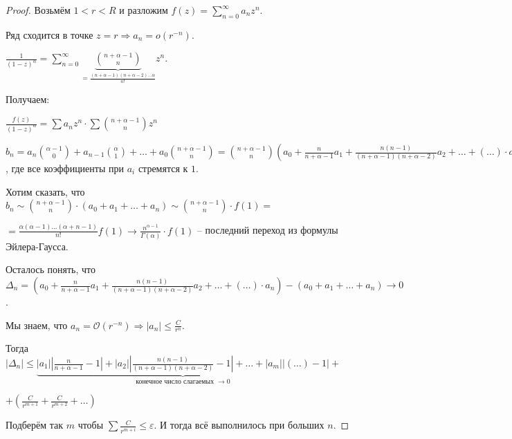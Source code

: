 \begin{proof}

    Возьмём $1 < r < R$ и разложим $f(z) = \sum_{n = 0}^{\infty} a_n z^n$.

    Ряд сходится в точке $z = r \Rightarrow a_n = o(r^{-n})$.

    $\frac{1}{(1 - z)^\alpha} = \sum_{n = 0}^{\infty} \underbrace{\binom{n + \alpha - 1}{n}}_{=\frac{(n + \alpha - 1)(n + \alpha - 2) \ldots \alpha}{n!}} z^n$.

    Получаем:

    $\frac{f(z)}{(1 - z)^\alpha} = \sum a_n z^n \cdot \sum \binom{n + \alpha - 1}{n} z^n$

    $b_n = a_n \binom{\alpha - 1}{0} + a_{n - 1}\binom{\alpha}{1} + \ldots + a_0 \binom{n + \alpha - 1}{n} = \binom{n + \alpha - 1}{n} (a_0 + \frac{n}{n + \alpha - 1} a_1 + \frac{n(n - 1)}{(n + \alpha - 1)(n + \alpha - 2)} a_2 + \ldots + (\ldots) \cdot a_n)$, где все коэффициенты при $a_i$ стремятся к $1$.

    Хотим сказать, что $b_n \sim \binom{n + \alpha - 1}{n} \cdot (a_0 + a_1 + \ldots + a_n) \sim \binom{n + \alpha - 1}{n} \cdot f(1) =$

    $= \frac{\alpha(\alpha - 1) \ldots (\alpha + n - 1)}{n!} f(1) \rightarrow \frac{n^{\alpha - 1}}{\Gamma(\alpha)} \cdot f(1)$ -- последний переход из формулы Эйлера-Гаусса.

    Осталось понять, что $\Delta_n = (a_0 + \frac{n}{n + \alpha - 1}a_1 + \frac{n(n - 1)}{(n + \alpha - 1)(n + \alpha -2)}a_2 + \ldots + (\ldots)\cdot a_n) - (a_0 + a_1 + \ldots +a_n) \rightarrow 0$.

    Мы знаем, что $a_n = \mathcal{O}(r^{-n}) \Rightarrow |a_n| \leqslant \frac{C}{r^n}$.

    Тогда $|\Delta_n| \leqslant
    \underbrace{|a_1| \left|\frac{n}{n + \alpha - 1} - 1\right| +
    |a_2| \left|\frac{n (n - 1)}{(n + \alpha - 1) (n + \alpha - 2)} - 1\right| +
    \ldots +
    |a_m| \left|(\ldots) - 1\right|}_{\text{конечное число слагаемых } \rightarrow 0} +$

    $+ \left(\frac{C}{r^{m + 1}} + \frac{C}{r^{m + 2}} + \ldots\right)$

    Подберём так $m$ чтобы $\sum \frac{C}{r^{m + i}} \leqslant \varepsilon$. И тогда всё выполнилось при больших $n$.
\end{proof}

